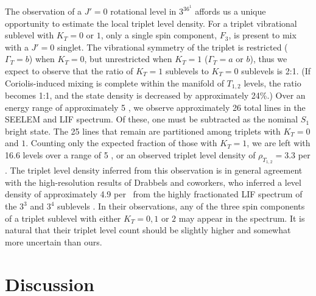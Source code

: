 \documentclass[12pt]{mitthesis}
\begin{document}
The observation of a $J'=0$ rotational level in $3^36^1$ 
affords us a unique opportunity to estimate the local triplet level
density.  For a triplet vibrational sublevel with $K_T=0$ or $1$, only
a single spin component, $F_3$, is present to mix with a $J'=0$
singlet.  The vibrational symmetry of the triplet is restricted
($\Gamma_T=b$) when $K_T=0$, but unrestricted when $K_T=1$
($\Gamma_T=a$ or $b$), thus we expect to observe that the ratio of
$K_T=1$ sublevels to $K_T=0$ sublevels is 2:1.  (If Coriolis-induced
mixing is complete within the manifold of $T_{1,2}$ levels, the ratio
becomes 1:1, and the state density is decreased by approximately
24\%.)  Over an energy range of approximately 5 \rcm, we observe
approximately 26 total lines in the SEELEM and LIF spectrum.  Of
these, one must be subtracted as the nominal $S_1$ bright state.  The
25 lines that remain are partitioned among triplets with $K_T=0$ and
$1$.  Counting only the expected fraction of those with $K_T=1$, we
are left with 16.6 levels over a range of 5 \rcm, or an observed
triplet level density of $\rho_{T_{1,2}} = 3.3$ per \rcm.  The triplet
level density inferred from this observation is in general agreement
with the high-resolution results of Drabbels and coworkers, who
inferred a level density of approximately 4.9 per \rcm\ from the
highly fractionated LIF spectrum of the $3^3$  and $3^4$ 
sublevels \cite{drabbels94}.  In their observations, any of the three
spin components of a triplet sublevel with either $K_T=0, 1$ or $2$
may appear in the spectrum.  It is natural that their triplet level
count should be slightly higher and somewhat more uncertain than ours.




















\section{Discussion}
\end{document}

